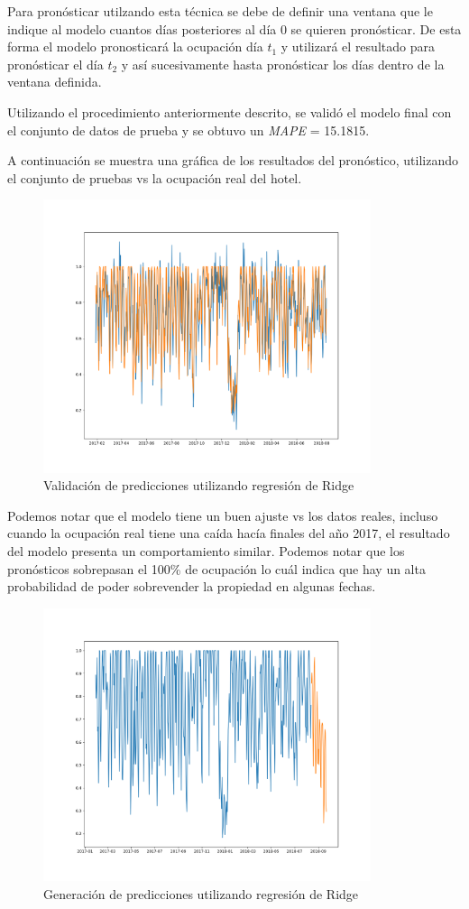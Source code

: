 Para pronósticar utilzando esta técnica se debe de definir una ventana que le indique al modelo cuantos días posteriores al día 0 se quieren pronósticar. De esta forma el modelo pronosticará la ocupación día $t_1$ y utilizará el resultado para pronósticar el día $t_2$ y así sucesivamente hasta pronósticar los días dentro de la ventana definida.

Utilizando el procedimiento anteriormente descrito, se validó el modelo final con el conjunto de datos de prueba y se obtuvo un \emph{MAPE} = 15.1815.

A continuación se muestra una gráfica de los resultados del pronóstico, utilizando el conjunto de pruebas vs la ocupación real del hotel.

\begin{figure}[H]
  \centering
      \includegraphics[width=\maxwidth,height=8cm]{figures/RidgeTest.png}    
  \caption{Validación de predicciones utilizando regresión de Ridge}
\end{figure}

Podemos notar que el modelo tiene un buen ajuste vs los datos reales, incluso cuando la ocupación real tiene una caída hacía finales del año 2017, el resultado del modelo presenta un comportamiento similar. Podemos notar que los pronósticos sobrepasan el 100\% de ocupación lo cuál indica que hay un alta probabilidad de poder sobrevender la propiedad en algunas fechas.

\begin{figure}[H]
  \centering
      \includegraphics[width=\maxwidth,height=8cm]{figures/RidgePronostico.png}    
  \caption{Generación de predicciones utilizando regresión de Ridge}
\end{figure}


